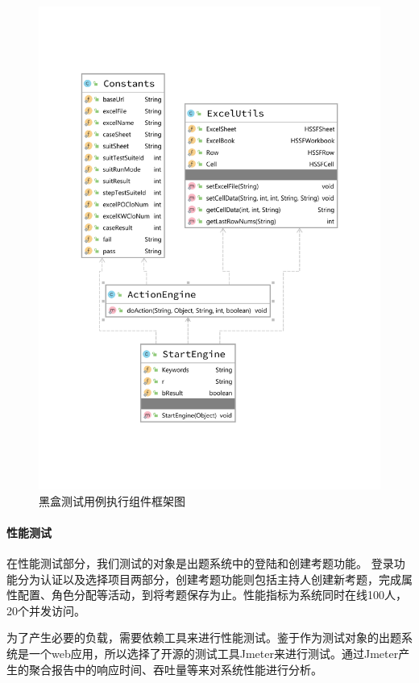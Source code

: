 \documentclass[hyperref, a4paper]{ctexart}
\let\oldparagraph\paragraph
\renewcommand{\paragraph}[1]{\oldparagraph{#1}\mbox{}}
\begin{document}
\begin{figure}
  \centering
  \includegraphics[width=18cm]{./assets/ActionEngineDiagram.pdf}
  \caption{黑盒测试用例执行组件框架图}\label{4}
\end{figure}

\hypertarget{ux6027ux80fdux6d4bux8bd5}{%
\paragraph{性能测试}\label{ux6027ux80fdux6d4bux8bd5}}

在性能测试部分，我们测试的对象是出题系统中的登陆和创建考题功能。
登录功能分为认证以及选择项目两部分，创建考题功能则包括主持人创建新考题，完成属性配置、角色分配等活动，到将考题保存为止。性能指标为系统同时在线100人，20个并发访问。

为了产生必要的负载，需要依赖工具来进行性能测试。鉴于作为测试对象的出题系统是一个web应用，所以选择了开源的测试工具Jmeter来进行测试。通过Jmeter产生的聚合报告中的响应时间、吞吐量等来对系统性能进行分析。
\end{document}
